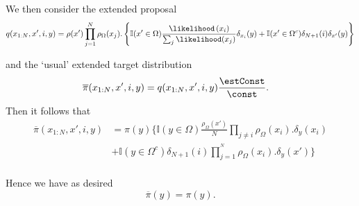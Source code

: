 We then consider the extended proposal
\[
q(x_{1:N},x',i,y)=\rho(x')\prod_{j=1}^{N}\rho_{\Omega}(x_{j}).\left\{ \mathbb{I}(x'\in\Omega)\frac{\likelihood\left(x_{i}\right)}{\sum_{j}\likelihood(x_{j})}\delta_{x_{i}}(y)+\mathbb{I}(x'\in\Omega^{c})\delta_{N+1}(i)\delta_{x'}(y)\right\}
\]

and the `usual' extended target distribution
\begin{align*}
\overline{\pi}(x_{1:N},x',i,y)=q(x_{1:N},x',i,y) & \frac{\estConst}{\const}.
\end{align*}
Then it follows that
\begin{align*}
\overline{\pi}(x_{1:N},x',i,y) & =\pi\left(y\right)\{ \mathbb{I}(y\in\Omega)\frac{\rho_{\Omega}(x')}{N}\prod_{j\neq i}\rho_{\Omega}(x_{i}).\delta_{y}(x_{i})\\
 & +\mathbb{I}(y\in\Omega^{c})\delta_{N+1}(i)\prod_{j=1}^{^{N}}\rho_{\Omega}(x_{i}).\delta_{y}(x')\}\\
\end{align*}

Hence we have as desired
\[
\overline{\pi}(y)=\pi\left(y\right).
\]